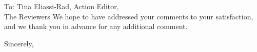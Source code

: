 \documentclass{letter}
\begin{document}
\begin{letter}{To: Tina Eliassi-Rad, Action Editor,\\%
	\qquad The Reviewers}
We hope to have addressed your comments to your satisfaction, and we thank you
in advance for any additional comment.
\closing{Sincerely,}
\end{letter}
\end{document}
